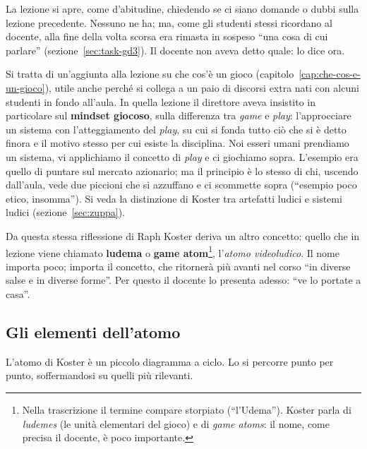 La lezione si apre, come d'abitudine, chiedendo se ci siano domande o dubbi
sulla lezione precedente. Nessuno ne ha; ma, come gli studenti stessi
ricordano al docente, alla fine della volta scorsa era rimasta in sospeso
``una cosa di cui parlare'' (sezione~\ref{sec:task-gd3}). Il docente non
aveva detto quale: lo dice ora.

Si tratta di un'aggiunta alla lezione su che cos'è un gioco
(capitolo~\ref{cap:che-cos-e-un-gioco}), utile anche perché si collega a un
paio di discorsi extra nati con alcuni studenti in fondo all'aula. In quella
lezione il direttore aveva insistito in particolare sul \textbf{mindset
giocoso}, sulla differenza tra \emph{game} e \emph{play}: l'approcciare un
sistema con l'atteggiamento del \emph{play}, su cui si fonda tutto ciò che si
è detto finora e il motivo stesso per cui esiste la disciplina. Noi esseri
umani prendiamo un sistema, vi applichiamo il concetto di \emph{play} e ci
giochiamo sopra. L'esempio era quello di puntare sul mercato azionario; ma il
principio è lo stesso di chi, uscendo dall'aula, vede due piccioni che si
azzuffano e ci scommette sopra (``esempio poco etico, insomma'').
Si veda la distinzione di Koster tra artefatti ludici e sistemi ludici
(sezione~\ref{sec:zuppa}).

Da questa stessa riflessione di Raph Koster deriva un altro concetto: quello
che in lezione viene chiamato \textbf{ludema} o \textbf{game
atom}\footnote{Nella trascrizione il termine compare storpiato
(``l'Udema''). Koster parla di \emph{ludemes} (le unità elementari del
gioco) e di \emph{game atoms}: il nome, come precisa il docente, è poco
importante.}, l'\emph{atomo videoludico}. Il nome importa poco; importa il
concetto, che ritornerà più avanti nel corso ``in diverse salse e in diverse
forme''. Per questo il docente lo presenta adesso: ``ve lo portate a casa''.

\subsection{Gli elementi dell'atomo}

L'atomo di Koster è un piccolo diagramma a ciclo. Lo si percorre punto per
punto, soffermandosi su quelli più rilevanti.

